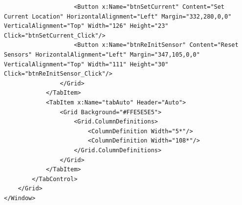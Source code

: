 \begin{lstlisting}
                    <Button x:Name="btnSetCurrent" Content="Set Current Location" HorizontalAlignment="Left" Margin="332,280,0,0" VerticalAlignment="Top" Width="126" Height="23" Click="btnSetCurrent_Click"/>
                    <Button x:Name="btnReInitSensor" Content="Reset Sensors" HorizontalAlignment="Left" Margin="347,105,0,0" VerticalAlignment="Top" Width="111" Height="30" Click="btnReInitSensor_Click"/>
                </Grid>
            </TabItem>
            <TabItem x:Name="tabAuto" Header="Auto">
                <Grid Background="#FFE5E5E5">
                    <Grid.ColumnDefinitions>
                        <ColumnDefinition Width="5*"/>
                        <ColumnDefinition Width="108*"/>
                    </Grid.ColumnDefinitions>
                </Grid>
            </TabItem>
        </TabControl>
    </Grid>
</Window>
\end{lstlisting}

